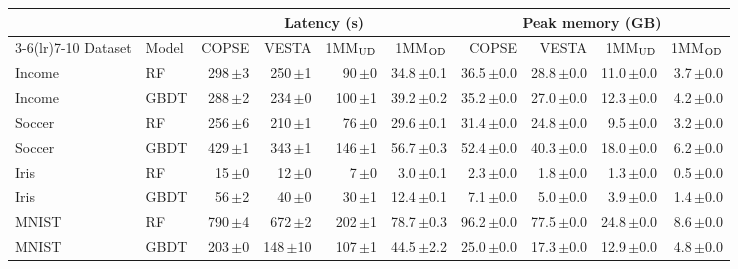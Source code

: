 \begin{tabular}{ll rrrr rrrr}
\toprule
 & & \multicolumn{4}{c}{Latency (s)} & \multicolumn{4}{c}{Peak memory (GB)} \\
\cmidrule(lr){3-6}\cmidrule(lr){7-10}
Dataset & Model & COPSE & VESTA & 1MM$_{\rm UD}$ & 1MM$_{\rm OD}$ & COPSE & VESTA & 1MM$_{\rm UD}$ & 1MM$_{\rm OD}$ \\
\midrule
Income & RF & 298\,{\footnotesize$\pm$3} & 250\,{\footnotesize$\pm$1} & 90\,{\footnotesize$\pm$0} & 34.8\,{\footnotesize$\pm$0.1} & 36.5\,{\footnotesize$\pm$0.0} & 28.8\,{\footnotesize$\pm$0.0} & 11.0\,{\footnotesize$\pm$0.0} & 3.7\,{\footnotesize$\pm$0.0} \\
Income & GBDT & 288\,{\footnotesize$\pm$2} & 234\,{\footnotesize$\pm$0} & 100\,{\footnotesize$\pm$1} & 39.2\,{\footnotesize$\pm$0.2} & 35.2\,{\footnotesize$\pm$0.0} & 27.0\,{\footnotesize$\pm$0.0} & 12.3\,{\footnotesize$\pm$0.0} & 4.2\,{\footnotesize$\pm$0.0} \\
Soccer & RF & 256\,{\footnotesize$\pm$6} & 210\,{\footnotesize$\pm$1} & 76\,{\footnotesize$\pm$0} & 29.6\,{\footnotesize$\pm$0.1} & 31.4\,{\footnotesize$\pm$0.0} & 24.8\,{\footnotesize$\pm$0.0} & 9.5\,{\footnotesize$\pm$0.0} & 3.2\,{\footnotesize$\pm$0.0} \\
Soccer & GBDT & 429\,{\footnotesize$\pm$1} & 343\,{\footnotesize$\pm$1} & 146\,{\footnotesize$\pm$1} & 56.7\,{\footnotesize$\pm$0.3} & 52.4\,{\footnotesize$\pm$0.0} & 40.3\,{\footnotesize$\pm$0.0} & 18.0\,{\footnotesize$\pm$0.0} & 6.2\,{\footnotesize$\pm$0.0} \\
Iris & RF & 15\,{\footnotesize$\pm$0} & 12\,{\footnotesize$\pm$0} & 7\,{\footnotesize$\pm$0} & 3.0\,{\footnotesize$\pm$0.1} & 2.3\,{\footnotesize$\pm$0.0} & 1.8\,{\footnotesize$\pm$0.0} & 1.3\,{\footnotesize$\pm$0.0} & 0.5\,{\footnotesize$\pm$0.0} \\
Iris & GBDT & 56\,{\footnotesize$\pm$2} & 40\,{\footnotesize$\pm$0} & 30\,{\footnotesize$\pm$1} & 12.4\,{\footnotesize$\pm$0.1} & 7.1\,{\footnotesize$\pm$0.0} & 5.0\,{\footnotesize$\pm$0.0} & 3.9\,{\footnotesize$\pm$0.0} & 1.4\,{\footnotesize$\pm$0.0} \\
MNIST & RF & 790\,{\footnotesize$\pm$4} & 672\,{\footnotesize$\pm$2} & 202\,{\footnotesize$\pm$1} & 78.7\,{\footnotesize$\pm$0.3} & 96.2\,{\footnotesize$\pm$0.0} & 77.5\,{\footnotesize$\pm$0.0} & 24.8\,{\footnotesize$\pm$0.0} & 8.6\,{\footnotesize$\pm$0.0} \\
MNIST & GBDT & 203\,{\footnotesize$\pm$0} & 148\,{\footnotesize$\pm$10} & 107\,{\footnotesize$\pm$1} & 44.5\,{\footnotesize$\pm$2.2} & 25.0\,{\footnotesize$\pm$0.0} & 17.3\,{\footnotesize$\pm$0.0} & 12.9\,{\footnotesize$\pm$0.0} & 4.8\,{\footnotesize$\pm$0.0} \\
\bottomrule
\end{tabular}
